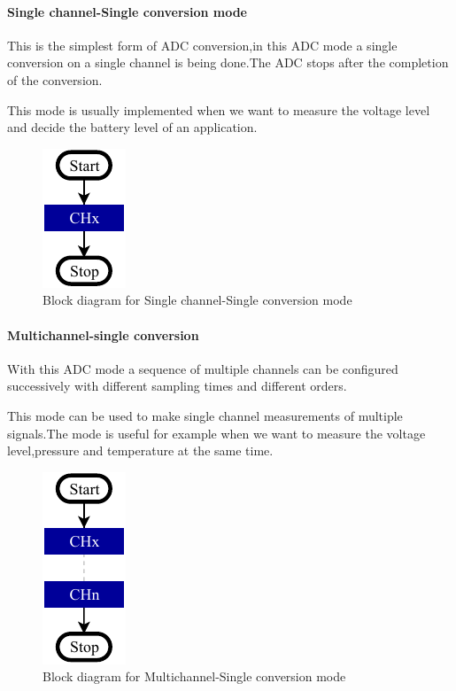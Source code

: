 \documentclass[a4paper, 11pt, openany, oneside]{book}
\begin{document}
\paragraph{Single channel-Single conversion mode}
This is the simplest form of ADC conversion,in this ADC mode a single conversion on a single channel is being done.The ADC stops after the completion of the conversion. \newline

This mode is usually implemented when we want to measure the voltage level and decide the battery level of an application.


\begin{figure}[b]
\centering
\includegraphics[width= 0.2\linewidth]{HS_STM32-single-channel-single-conversion-mode.pdf}
\caption{Block diagram for Single channel-Single conversion mode}
\end{figure}

\newpage
\paragraph{Multichannel-single conversion}



With this ADC mode a sequence of multiple channels can be configured successively  with different sampling times and different orders.

This mode can be used to make single channel measurements of multiple signals.The mode is useful for example when we want to measure the voltage level,pressure and temperature at the same time. 



\begin{figure}[b]
\centering
\includegraphics[width= 0.2\linewidth]{HS_STM32-single-channel_multi-single-conversion.pdf}
\caption{Block diagram for Multichannel-Single conversion mode}
\end{figure}
\end{document}
